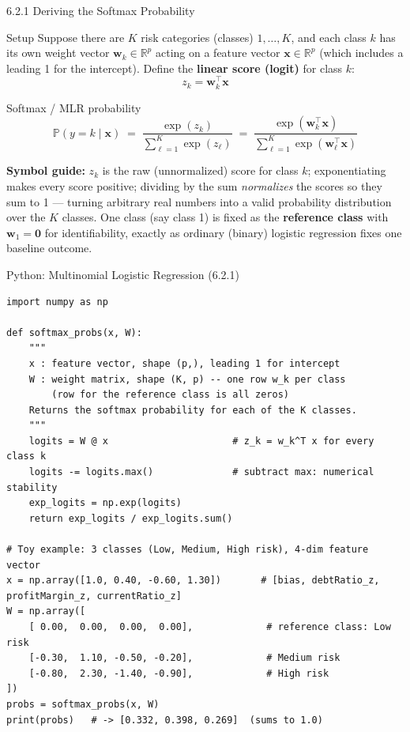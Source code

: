 \documentclass[aspectratio=169,10pt]{beamer}
\newcommand{\Real}{\mathbb{R}}
\newcommand{\Prob}{\mathbb{P}}
\newcommand{\x}{\mathbf{x}}
\begin{document}
\begin{frame}{6.2.1 Deriving the Softmax Probability}
  \begin{block}{Setup}
    Suppose there are $K$ risk categories (classes) $1,\ldots,K$, and each
    class $k$ has its own weight vector $\mathbf{w}_k \in \Real^{p}$ acting
    on a feature vector $\x \in \Real^p$ (which includes a leading 1 for the
    intercept). Define the \textbf{linear score (logit)} for class $k$:
    \[
      z_k = \mathbf{w}_k^\top \x
    \]
  \end{block}
  \begin{block}{Softmax / MLR probability}
    \[
      \Prob(y = k \mid \x) \;=\; \frac{\exp(z_k)}{\displaystyle\sum_{\ell=1}^{K}\exp(z_\ell)}
      \;=\; \frac{\exp(\mathbf{w}_k^\top \x)}{\displaystyle\sum_{\ell=1}^{K}\exp(\mathbf{w}_\ell^\top \x)}
    \]
  \end{block}
  \textbf{Symbol guide:} $z_k$ is the raw (unnormalized) score for class $k$;
  exponentiating makes every score positive; dividing by the sum
  \emph{normalizes} the scores so they sum to 1 --- turning arbitrary real
  numbers into a valid probability distribution over the $K$ classes. One
  class (say class 1) is fixed as the \textbf{reference class} with
  $\mathbf{w}_1 = \mathbf{0}$ for identifiability, exactly as ordinary
  (binary) logistic regression fixes one baseline outcome.
\end{frame}

\begin{frame}[fragile]{Python: Multinomial Logistic Regression (6.2.1)}
\begin{lstlisting}
import numpy as np

def softmax_probs(x, W):
    """
    x : feature vector, shape (p,), leading 1 for intercept
    W : weight matrix, shape (K, p) -- one row w_k per class
        (row for the reference class is all zeros)
    Returns the softmax probability for each of the K classes.
    """
    logits = W @ x                      # z_k = w_k^T x for every class k
    logits -= logits.max()              # subtract max: numerical stability
    exp_logits = np.exp(logits)
    return exp_logits / exp_logits.sum()

# Toy example: 3 classes (Low, Medium, High risk), 4-dim feature vector
x = np.array([1.0, 0.40, -0.60, 1.30])       # [bias, debtRatio_z, profitMargin_z, currentRatio_z]
W = np.array([
    [ 0.00,  0.00,  0.00,  0.00],             # reference class: Low risk
    [-0.30,  1.10, -0.50, -0.20],             # Medium risk
    [-0.80,  2.30, -1.40, -0.90],             # High risk
])
probs = softmax_probs(x, W)
print(probs)   # -> [0.332, 0.398, 0.269]  (sums to 1.0)
\end{lstlisting}
\end{frame}
\end{document}
